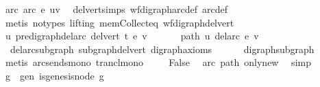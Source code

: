 \begin{isabellebody}
\ arc{\isacharcolon}{\kern0pt}\ {\isachardoublequoteopen}arc\ e\ {\isacharparenleft}{\kern0pt}u{\isacharcomma}{\kern0pt}v{\isacharparenright}{\kern0pt}{\isachardoublequoteclose}\ \isamarkupfalse%
\ del{\isacharunderscore}{\kern0pt}vert{\isacharunderscore}{\kern0pt}simps\ wf{\isacharunderscore}{\kern0pt}digraph{\isachardot}{\kern0pt}arc{\isacharunderscore}{\kern0pt}def\ arc{\isacharunderscore}{\kern0pt}def\isanewline
\ \ \ \ \isamarkupfalse%
\ {\isacharparenleft}{\kern0pt}metis\ {\isacharparenleft}{\kern0pt}no{\isacharunderscore}{\kern0pt}types{\isacharcomma}{\kern0pt}\ lifting{\isacharparenright}{\kern0pt}\ mem{\isacharunderscore}{\kern0pt}Collect{\isacharunderscore}{\kern0pt}eq\ wf{\isacharunderscore}{\kern0pt}digraph{\isacharunderscore}{\kern0pt}del{\isacharunderscore}{\kern0pt}vert{\isacharparenright}{\kern0pt}\isanewline
\ \ \isamarkupfalse%
\ {\isachardoublequoteopen}u\ {\isasymrightarrow}\isactrlsup {\isacharplus}{\kern0pt}\isactrlbsub pre{\isacharunderscore}{\kern0pt}digraph{\isachardot}{\kern0pt}del{\isacharunderscore}{\kern0pt}arc\ {\isacharparenleft}{\kern0pt}del{\isacharunderscore}{\kern0pt}vert\ t{\isacharparenright}{\kern0pt}\ e\isactrlesub \ v{\isachardoublequoteclose}\ \isanewline
\ \ \isamarkupfalse%
\ \isamarkupfalse%
\ path{\isacharcolon}{\kern0pt}\ {\isachardoublequoteopen}u\ {\isasymrightarrow}\isactrlsup {\isacharplus}{\kern0pt}\isactrlbsub del{\isacharunderscore}{\kern0pt}arc\ e\isactrlesub \ v{\isachardoublequoteclose}\isanewline
\ \ \ \ \isamarkupfalse%
\ \ del{\isacharunderscore}{\kern0pt}arc{\isacharunderscore}{\kern0pt}subgraph\ subgraph{\isacharunderscore}{\kern0pt}del{\isacharunderscore}{\kern0pt}vert\ digraph{\isacharunderscore}{\kern0pt}axioms\isanewline
\ \ \ \ \ \ digraph{\isacharunderscore}{\kern0pt}subgraph\ \isanewline
\ \ \ \ \isamarkupfalse%
\ {\isacharparenleft}{\kern0pt}metis\ arcs{\isacharunderscore}{\kern0pt}ends{\isacharunderscore}{\kern0pt}mono\ trancl{\isacharunderscore}{\kern0pt}mono{\isacharparenright}{\kern0pt}\ \isanewline
\ \ \isamarkupfalse%
\ False\ \isamarkupfalse%
\ arc\ path\ only{\isacharunderscore}{\kern0pt}new\ \isamarkupfalse%
\ simp\isanewline
{}\isamarkupfalse%
\isanewline
\ \ \isamarkupfalse%
\ g\ \ gen{\isacharcolon}{\kern0pt}\ {\isachardoublequoteopen}is{\isacharunderscore}{\kern0pt}genesis{\isacharunderscore}{\kern0pt}node\ g{\isachardoublequoteclose}\ \isamarkupfalse%

\end{isabellebody}
